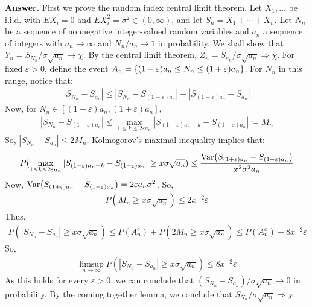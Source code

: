 \documentclass[12pt]{article}
\def\ve{\varepsilon}
\newcommand{\Var}{\mathrm{Var}\qty}
\newcommand{\SET}[1]{\Set{\mskip-\medmuskip #1 \mskip-\medmuskip}}
\begin{document}
    \textbf{Answer.}
    First we prove the random index central limit theorem. Let $X_1, \ldots$ be i.i.d. with $EX_i = 0$ and $EX_i^2 = \sigma^2 \in (0,\infty)$, and let $S_n = X_1 + \cdots + X_n$. Let $N_n$ be a sequence of nonnegative integer-valued random variables and $a_n$ a sequence of integers with $a_n \to \infty$ and $N_n/a_n \to 1$ in probability. We shall show that $Y_n = S_{N_n}/\sigma \sqrt{a_n} \to \chi$. By the central limit theorem, $Z_n = S_{a_n}/\sigma \sqrt{a_n} \Rightarrow \chi$. For fixed $\ve > 0$, define the event $A_n = \SET{(1-\ve)a_n \leq N_n \leq (1+\ve)a_n}$. For $N_n$ in this range, notice that:
    \begin{align*}
        |S_{N_n} - S_{a_n}| \leq |S_{N_n} - S_{(1-\ve)a_n}| + |S_{(1-\ve)a_n} - S_{a_n}|
    \end{align*}
    Now, for $N_n \in [(1-\ve)a_n, (1+\ve)a_n]$, 
    \begin{align*}
        |S_{N_n} - S_{(1-\ve)a_n}| \leq \max_{1 \leq k \leq 2\ve a_n} |S_{(1-\ve)a_n + k} - S_{(1-\ve)a_n}| \coloneqq M_n
    \end{align*}
    So, $|S_{N_n} - S_{a_n}| \leq 2M_n$. Kolmogorov's maximal inequality implies that:
    \begin{align*}
        P(\max_{1 \leq k \leq 2\ve a_n} |S_{(1-\ve)a_n + k} - S_{(1-\ve)a_n}| \geq x \sigma \sqrt{a_n}) \leq \frac{\Var(S_{(1+\ve)a_n} - S_{(1-\ve)a_n})}{x^2 \sigma^2 a_n}
    \end{align*}
    Now, $\Var(S_{(1+\ve)a_n} - S_{(1-\ve)a_n}) = 2 \ve a_n \sigma^2$. So,
    \begin{align*}
        P(M_n \geq x \sigma \sqrt{a_n}) \leq 2 x^{-2} \ve 
    \end{align*}
    Thus, 
    \begin{align*}
        P(|S_{N_n} - S_{a_n}| \geq x \sigma \sqrt{a_n}) \leq P(A_n^c) + P(2M_n \geq x \sigma \sqrt{a_n}) \leq P(A_n^c) + 8x^{-2} \ve
    \end{align*}
    So,
    \begin{align*}
        \limsup_{n \to \infty} P(|S_{N_n} - S_{a_n}| \geq x \sigma \sqrt{a_n}) \leq 8x^{-2} \ve
    \end{align*}
    As this holds for every $\ve > 0$, we can conclude  that $(S_{N_n} - S_{a_n})/\sigma \sqrt{a_n} \to 0$ in probability. By the coming together lemma, we conclude that $S_{N_n}/\sigma \sqrt{a_n} \Rightarrow \chi$.
    
\end{document}

